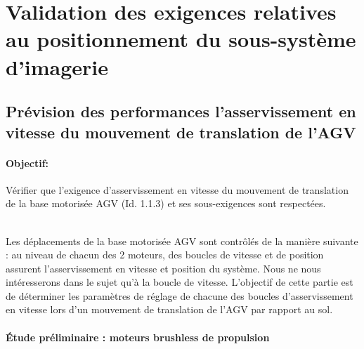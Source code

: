 \section{Validation des exigences relatives au positionnement du sous-système d'imagerie}

\subsection{Prévision des performances \og l'asservissement en vitesse du mouvement de translation de l'AGV \fg}

\paragraph{Objectif:} Vérifier que l'exigence d'asservissement en vitesse du mouvement de translation de la base motorisée AGV (Id. 1.1.3) et ses sous-exigences sont respectées.

~\ \\

Les déplacements de la base motorisée AGV sont contrôlés de la manière suivante : au niveau de chacun des 2 moteurs, des boucles de vitesse et de position assurent l'asservissement en vitesse et position du système. Nous ne nous intéresserons dans le sujet qu'à la boucle de vitesse. L'objectif de cette partie est de déterminer les paramètres de réglage de chacune des boucles d'asservissement en vitesse lors d'un mouvement de translation de l'AGV par rapport au sol.

\newpage

\paragraph{Étude préliminaire : moteurs brushless de propulsion}

